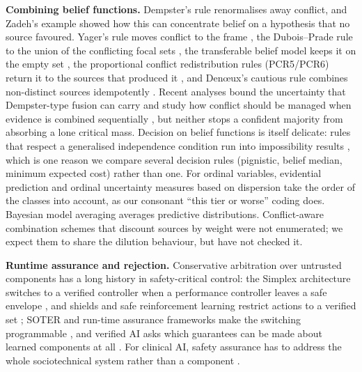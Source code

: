 \documentclass[11pt,a4paper]{article}%
\begin{document}
\textbf{Combining belief functions.} Dempster's rule \cite{shafer1976mathematical} renormalises away conflict, and Zadeh's example \cite{zadeh1986simple} showed how this can concentrate belief on a hypothesis that no source favoured. Yager's rule moves conflict to the frame \cite{yager1987dempster}, the Dubois--Prade rule to the union of the conflicting focal sets \cite{dubois1988representation}, the transferable belief model keeps it on the empty set \cite{smets1994transferable}, the proportional conflict redistribution rules (PCR5/PCR6) return it to the sources that produced it \cite{smarandache2005information,martin2007toward}, and Den\oe{}ux's cautious rule combines non-distinct sources idempotently \cite{denoeux2008conjunctive}. Recent analyses bound the uncertainty that Dempster-type fusion can carry \cite{deng2025upper} and study how conflict should be managed when evidence is combined sequentially \cite{zhou2026conflict}, but neither stops a confident majority from absorbing a lone critical mass. Decision on belief functions is itself delicate: rules that respect a generalised independence condition run into impossibility results \cite{fargier2024decision}, which is one reason we compare several decision rules (pignistic, belief median, minimum expected cost) rather than one. For ordinal variables, evidential prediction \cite{ramel2025exact} and ordinal uncertainty measures based on dispersion \cite{haas2025uncertainty} take the order of the classes into account, as our consonant ``this tier or worse'' coding does. Bayesian model averaging \cite{hoeting1999bayesian} averages predictive distributions. Conflict-aware combination schemes that discount sources by weight \cite{dong2024conflict} were not enumerated; we expect them to share the dilution behaviour, but have not checked it.

\textbf{Runtime assurance and rejection.} Conservative arbitration over untrusted components has a long history in safety-critical control: the Simplex architecture switches to a verified controller when a performance controller leaves a safe envelope \cite{seto1998simplex,sha2001using}, and shields and safe reinforcement learning restrict actions to a verified set \cite{alshiekh2018safe,fulton2018safe}; SOTER and run-time assurance frameworks make the switching programmable \cite{desai2019soter,cofer2020run}, and verified AI asks which guarantees can be made about learned components at all \cite{seshia2022toward}. For clinical AI, safety assurance has to address the whole sociotechnical system rather than a component \cite{habli2020artificial,sujan2019human}.
\end{document}
